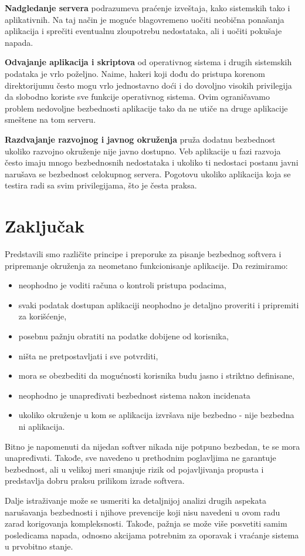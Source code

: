 \documentclass[a4paper]{article}
\begin{document}
\textbf{Nadgledanje servera} podrazumeva praćenje izveštaja, kako sistemskih tako i aplikativnih. Na taj način je moguće blagovremeno uočiti neobična ponašanja aplikacija i sprečiti eventualnu zloupotrebu nedostataka, ali i uočiti pokušaje napada.

\textbf{Odvajanje aplikacija i skriptova} od operativnog sistema i drugih sistemskih podataka je vrlo poželjno. Naime, hakeri koji dođu do pristupa korenom direktorijumu često mogu vrlo jednostavno doći i do dovoljno visokih privilegija da slobodno koriste sve funkcije operativnog sistema. Ovim ograničavamo problem nedovoljne bezbednosti aplikacije tako da ne utiče na druge aplikacije smeštene na tom serveru.

\textbf{Razdvajanje razvojnog i javnog okruženja} pruža dodatnu bezbednost ukoliko razvojno okruženje nije javno dostupno. Veb aplikacije u fazi razvoja često imaju mnogo bezbednosnih nedostataka i ukoliko ti nedostaci postanu javni narušava se bezbednost celokupnog servera. Pogotovu ukoliko aplikacija koja se testira radi sa svim privilegijama, što je česta praksa.

\section{Zaključak} \label{zakljucak}

Predstavili smo različite principe i preporuke za pisanje bezbednog softvera i pripremanje okruženja za neometano funkcionisanje aplikacije. Da rezimiramo:
\begin{itemize}
	\item neophodno je voditi računa o kontroli pristupa podacima,
	\item svaki podatak dostupan aplikaciji neophodno je detaljno proveriti i pripremiti za korišćenje,
	\item posebnu pažnju obratiti na podatke dobijene od korisnika,
	\item ništa ne pretpostavljati i sve potvrditi,
	\item mora se obezbediti da mogućnosti korisnika budu jasno i striktno definisane,
	\item neophodno je unapređivati bezbednost sistema nakon incidenata
	\item ukoliko okruženje u kom se aplikacija izvršava nije bezbedno - nije bezbedna ni aplikacija.
\end{itemize}

Bitno je napomenuti da nijedan softver nikada nije potpuno bezbedan, te se mora unapređivati. Takođe, sve navedeno u prethodnim poglavljima ne garantuje bezbednost, ali u velikoj meri smanjuje rizik od pojavljivanja propusta i predstavlja dobru praksu prilikom izrade softvera.

Dalje istraživanje može se usmeriti ka detaljnijoj analizi drugih aspekata narušavanja bezbednosti i njihove prevencije koji nisu navedeni u ovom radu zarad korigovanja kompleksnosti. Takođe, pažnja se može više posvetiti samim posledicama napada, odnosno akcijama potrebnim za oporavak i vraćanje sistema u prvobitno stanje.


\nocite{*}
\appendix
{}


\end{document}
